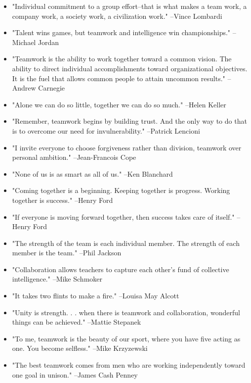 \begin{itemize}
\item
"Individual commitment to a group effort--that is what makes a team work, a company work, a society work, a civilization work." --Vince Lombardi
\item
"Talent wins games, but teamwork and intelligence win championships." --Michael Jordan
\item
"Teamwork is the ability to work together toward a common vision. The ability to direct individual accomplishments toward organizational objectives. It is the fuel that allows common people to attain uncommon results." --Andrew Carnegie
\item
"Alone we can do so little, together we can do so much." --Helen Keller
\item
"Remember, teamwork begins by building trust. And the only way to do that is to overcome our need for invulnerability." --Patrick Lencioni
\item
"I invite everyone to choose forgiveness rather than division, teamwork over personal ambition." --Jean-Francois Cope
\item
"None of us is as smart as all of us." --Ken Blanchard
\item
"Coming together is a beginning. Keeping together is progress. Working together is success." --Henry Ford
\item
"If everyone is moving forward together, then success takes care of itself." --Henry Ford
\item
"The strength of the team is each individual member. The strength of each member is the team." --Phil Jackson
\item
"Collaboration allows teachers to capture each other's fund of collective intelligence." --Mike Schmoker
\item
"It takes two flints to make a fire." --Louisa May Alcott
\item
"Unity is strength. . . when there is teamwork and collaboration, wonderful things can be achieved." --Mattie Stepanek
\item
"To me, teamwork is the beauty of our sport, where you have five acting as one. You become selfless." --Mike Krzyzewski
\item
"The best teamwork comes from men who are working independently toward one goal in unison." --James Cash Penney
\end{itemize}